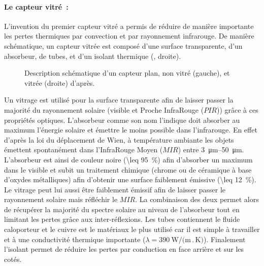 \paragraph{Le capteur vitré~:} %
\label{par:le_capteur_vitre}
L’invention du premier capteur vitré  a permis de réduire de manière
importante les pertes thermiques par convection et par rayonnement infrarouge.
De manière schématique, un capteur vitrée est composé d’une surface transparente, d’un absorbeur,
de tubes, et d’un isolant thermique (, droite).

\begin{figure}
    \centering
    \caption{Description schématique d’un capteur plan, non vitré (gauche), et vitrée (droite)
             d’après.}
    \label{fig:schema_capteur_plan}
\end{figure}

Un vitrage est utilisé pour la surface transparente afin de laisser passer la
majorité du rayonnement solaire (visible et Proche InfraRouge ($PIR$)) grâce à ces propriétés
optiques.
L’absorbeur comme son nom l’indique doit absorber au maximum l’énergie solaire et
émettre le moins possible dans l’infrarouge. En effet d’après la loi du déplacement
de Wien, à température ambiante les objets émettent spontanément dans l’InfraRouge
Moyen ($MIR$) entre \SIrange{3}{50}{\micro\metre}.
L’absorbeur est ainsi de couleur noire (\SI{\leq 95}{\percent}) afin d’absorber un maximum dans le visible
et subit un traitement chimique (chrome ou de céramique à base d’oxydes
métalliques) afin d’obtenir une surface faiblement émissive (\SI{\leq 12}{\percent}).
Le vitrage peut lui aussi être faiblement émissif afin de laisser passer le rayonnement
solaire mais réfléchir le $MIR$. La combinaison des deux permet alors de récupérer
la majorité du spectre solaire au niveau de l’absorbeur tout en limitant les
pertes grâce aux inter-réflexions. Les tubes contiennent le fluide caloporteur
et le cuivre est le matériaux le plus utilisé car il est simple à travailler et
à une conductivité thermique importante ($\lambda = \SI{390}{\watt\per(\metre\period\kelvin)}$).
Finalement l’isolant permet de réduire les pertes par conduction en face arrière et
sur les cotés.


